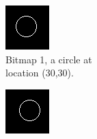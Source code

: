 \documentclass[12pt]{article}
\begin{document}
\begin{figure}
\centering
\begin{subfigure}[b]{.3\linewidth}
\includegraphics[width=\linewidth]{circle-left.png}
\caption{Bitmap 1, a circle at \\ location (30,30).}
\label{fig:circle-left}
\end{subfigure}
\begin{subfigure}[b]{.3\linewidth}
\includegraphics[width=\linewidth]{circle-right.png}

\end{subfigure}
\end{figure}
\end{document}
